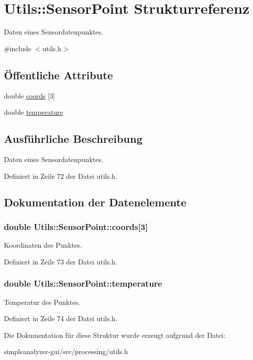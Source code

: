 \hypertarget{structUtils_1_1SensorPoint}{\section{Utils\-:\-:Sensor\-Point Strukturreferenz}
\label{structUtils_1_1SensorPoint}
}


Daten eines Sensordatenpunktes.  




{\ttfamily \#include $<$utils.\-h$>$}

\subsection*{Öffentliche Attribute}
\begin{DoxyCompactItemize}
\item 
double \hyperlink{structUtils_1_1SensorPoint_aedff5493c2f6c36e9552dc3807c8ce24}{coords} \mbox{[}3\mbox{]}
\item 
double \hyperlink{structUtils_1_1SensorPoint_a764d6572f865138b36cb46c910001e9a}{temperature}
\end{DoxyCompactItemize}


\subsection{Ausführliche Beschreibung}
Daten eines Sensordatenpunktes. 

Definiert in Zeile 72 der Datei utils.\-h.



\subsection{Dokumentation der Datenelemente}
\hypertarget{structUtils_1_1SensorPoint_aedff5493c2f6c36e9552dc3807c8ce24}{
\subsubsection[{coords}]{\setlength{\rightskip}{0pt plus 5cm}double Utils\-::\-Sensor\-Point\-::coords\mbox{[}3\mbox{]}}}\label{structUtils_1_1SensorPoint_aedff5493c2f6c36e9552dc3807c8ce24}
Koordinaten des Punktes. 

Definiert in Zeile 73 der Datei utils.\-h.

\hypertarget{structUtils_1_1SensorPoint_a764d6572f865138b36cb46c910001e9a}{
\subsubsection[{temperature}]{\setlength{\rightskip}{0pt plus 5cm}double Utils\-::\-Sensor\-Point\-::temperature}}\label{structUtils_1_1SensorPoint_a764d6572f865138b36cb46c910001e9a}
Temperatur des Punktes. 

Definiert in Zeile 74 der Datei utils.\-h.



Die Dokumentation für diese Struktur wurde erzeugt aufgrund der Datei\-:\begin{DoxyCompactItemize}
\item 
simpleanalyzer-\/gui/src/processing/utils.\-h\end{DoxyCompactItemize}
